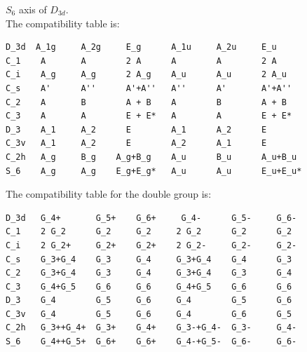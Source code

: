 \documentclass[12pt,a4paper]{article}
\begin{document}
$S_6$ axis of $D_{3d}$. \\
The compatibility table is:
\begin{verbatim}
D_3d  A_1g     A_2g     E_g      A_1u     A_2u     E_u
C_1    A       A        2 A      A        A        2 A
C_i    A_g     A_g      2 A_g    A_u      A_u      2 A_u
C_s    A'      A''      A'+A''   A''      A'       A'+A''
C_2    A       B        A + B    A        B        A + B
C_3    A       A        E + E*   A        A        E + E*
D_3    A_1     A_2      E        A_1      A_2      E
C_3v   A_1     A_2      E        A_2      A_1      E
C_2h   A_g     B_g    A_g+B_g    A_u      B_u      A_u+B_u   
S_6    A_g     A_g    E_g+E_g*   A_u      A_u      E_u+E_u*
\end{verbatim}
The compatibility table for the double group is:
\begin{verbatim}
D_3d   G_4+       G_5+    G_6+     G_4-      G_5-     G_6-
C_1    2 G_2      G_2     G_2     2 G_2      G_2      G_2      
C_i    2 G_2+     G_2+    G_2+    2 G_2-     G_2-     G_2-
C_s    G_3+G_4    G_3     G_4     G_3+G_4    G_4      G_3
C_2    G_3+G_4    G_3     G_4     G_3+G_4    G_3      G_4    
C_3    G_4+G_5    G_6     G_6     G_4+G_5    G_6      G_6
D_3    G_4        G_5     G_6     G_4        G_5      G_6
C_3v   G_4        G_5     G_6     G_4        G_6      G_5
C_2h   G_3++G_4+  G_3+    G_4+    G_3-+G_4-  G_3-     G_4-
S_6    G_4++G_5+  G_6+    G_6+    G_4-+G_5-  G_6-     G_6-
\end{verbatim}
\end{document}
